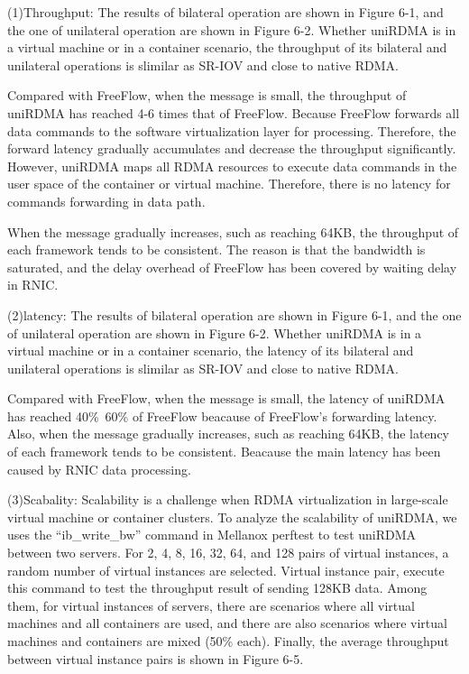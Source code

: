 \documentclass[sigplan,screen]{acmart}
\begin{document}
(1)Throughput: The results of bilateral operation are shown in Figure 6-1, and the one of unilateral operation are shown in Figure 6-2. Whether uniRDMA is in a virtual machine or in a container scenario, the throughput of its bilateral and unilateral operations is slimilar as SR-IOV and close to native RDMA.

Compared with FreeFlow, when the message is small, the throughput of uniRDMA has reached 4-6 times that of FreeFlow. Because FreeFlow forwards all data commands to the software virtualization layer for processing. Therefore, the forward latency gradually accumulates and decrease the throughput significantly. However, uniRDMA maps all RDMA resources to execute data commands in the user space of the container or virtual machine. Therefore, there is no latency for  commands forwarding in data path.

When the message gradually increases, such as reaching 64KB, the throughput of each framework tends to be consistent. The reason is that the bandwidth is saturated, and the delay overhead of FreeFlow has been covered by waiting delay in RNIC.

(2)latency: The results of bilateral operation are shown in Figure 6-1, and the one of unilateral operation are shown in Figure 6-2. Whether uniRDMA is in a virtual machine or in a container scenario, the latency of its bilateral and unilateral operations is slimilar as SR-IOV and close to native RDMA.

Compared with FreeFlow, when the message is small, the latency of uniRDMA has reached 40\%~60\%  of FreeFlow beacause of FreeFlow's forwarding latency. Also, when the message gradually increases, such as reaching 64KB, the latency of each framework tends to be consistent. Beacause the main latency has been caused by RNIC data processing.

(3)Scabality: 
Scalability is a challenge when RDMA virtualization in large-scale virtual machine or container clusters. To analyze the scalability of uniRDMA, we uses the ``ib\_write\_bw'' command in Mellanox perftest to test uniRDMA between two servers. For 2, 4, 8, 16, 32, 64, and 128 pairs of virtual instances, a random number of virtual instances are selected. Virtual instance pair, execute this command to test the throughput result of sending 128KB data. Among them, for virtual instances of servers, there are scenarios where all virtual machines and all containers are used, and there are also scenarios where virtual machines and containers are mixed (50\% each). Finally, the average throughput between virtual instance pairs is shown in Figure 6-5.
\end{document}
